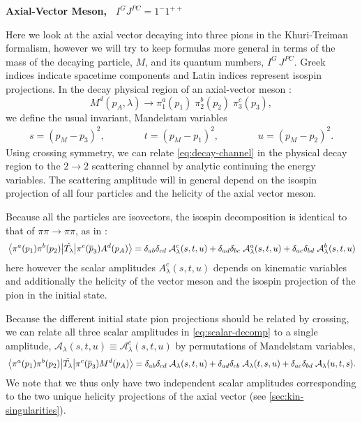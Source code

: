 \documentclass[10pt, aps,prd,amsmath,amssymb,superscriptaddress,onecolumn,
nofootinbib,showpacs,preprintnumbers]{revtex4-1}
\begin{document}
\begin{center}
\large \textbf{Axial-Vector Meson, \, \(I^G J^{PC} = 1^-1^{++}\)}
\end{center}
Here we look at the axial vector decaying into three pions in the Khuri-Treiman formalism, however we will try to keep formulas more general in terms of the mass of the decaying particle, \(M\), and its quantum numbers, \(I^G \, J^{PC}\). Greek indices indicate spacetime components and Latin indices represent isospin projections.
In the decay physical region of an axial-vector meson :
  \begin{equation}
    \label{eq:decay-channel}
    M^d(p_A, \lambda) \rightarrow \pi_1^a(p_1)\;  \pi_2^b(p_2) \; \pi^c_3(p_3),
  \end{equation}
we define the usual invariant, Mandelstam variables
  \begin{align}
    s = (p_M - p_3)^2,  \qquad \qquad t = (p_M - p_1)^2,  \qquad  \qquad u = (p_M-p_2)^2.
  \end{align}
Using crossing symmetry, we can relate \cref{eq:decay-channel} in the physical decay region to the \(2\to2\) scattering channel by analytic continuing the energy variables. The scattering amplitude will in general depend on the isospin projection of all four particles and the helicity of the axial vector meson.

Because all the particles are isovectors, the isospin decomposition is identical to that of \(\pi\pi\to\pi\pi\), as in \cite{Albaladejo2018}:
  \begin{equation}
    \mel{\pi^a(p_1)\pi^b(p_2)}{\hat{T_\lambda}}{\pi^c(\overline{p}_3)A^d(p_A)} = \delta_{ab}\delta_{cd} \; \mathcal{A}^{c}_\lambda(s,t,u) + \delta_{ad}\delta_{bc} \; \mathcal{A}^{a}_\lambda(s,t,u) + \delta_{ac}\delta_{bd} \; \mathcal{A}^{b}_\lambda(s,t,u)
  \end{equation}
here however the scalar amplitudes \(A^c_\lambda(s,t,u)\) depends on kinematic variables and additionally the helicity of the vector meson and the isospin projection of the pion in the initial state.

Because the different initial state pion projections should be related by crossing, we can relate all three scalar amplitudes in \cref{eq:scalar-decomp} to a single amplitude, \(\mathcal{A}_\lambda(s,t,u) \equiv \mathcal{A}_\lambda^{c}(s,t,u)\) by permutations of Mandelstam variables,
\begin{equation}
  \label{eq:scalar-decomp}
  \mel{\pi^a(p_1)\pi^b(p_2)}{\hat{T_\lambda}}{\pi^c(\overline{p}_3)M^d(p_A)} = \delta_{ab}\delta_{cd} \; \mathcal{A}_\lambda(s,t,u) + \delta_{ad}\delta_{cb} \; \mathcal{A}_\lambda(t,s,u) + \delta_{ac}\delta_{bd} \; \mathcal{A}_\lambda(u,t,s).
\end{equation}
We note that we thus only have two independent scalar amplitudes corresponding to the two unique helicity projections of the axial vector (see \cref{sec:kin-singularities}).
\end{document}
